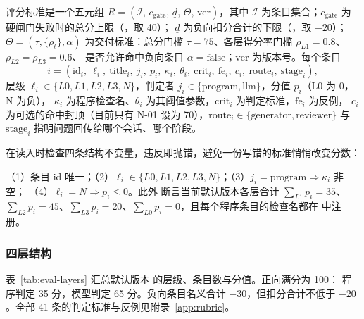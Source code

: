 \begin{definition}[评分标准]
\label{def:eval-rubric}
评分标准是一个五元组 $R=(\mathcal{I},\,c_{\mathrm{gate}},\,\underline{d},\,\Theta,\,\mathrm{ver})$，其中
$\mathcal{I}$ 为条目集合；$c_{\mathrm{gate}}$ 为硬闸门失败时的总分上限（，取 40）；
$\underline{d}$ 为负向扣分合计的下限（，取 $-20$）；
$\Theta=(\tau,\{\rho_\ell\},\alpha)$ 为交付标准：总分门槛 $\tau=75$、各层得分率门槛 $\rho_{L1}=0.8$、$\rho_{L2}=\rho_{L3}=0.6$、
是否允许命中负向条目 $\alpha=\text{false}$；$\mathrm{ver}$ 为版本号。每个条目
\[
i=(\mathrm{id}_i,\ \ell_i,\ \mathrm{title}_i,\ j_i,\ p_i,\ \kappa_i,\ \theta_i,\ \mathrm{crit}_i,\ \mathrm{fe}_i,\ c_i,\ \mathrm{route}_i,\ \mathrm{stage}_i),
\]
层级 $\ell_i\in\{L0,L1,L2,L3,N\}$，判定者 $j_i\in\{\text{program},\text{llm}\}$，分值 $p_i$（L0 为 0，N 为负），
$\kappa_i$ 为程序检查名、$\theta_i$ 为其阈值参数，$\mathrm{crit}_i$ 为判定标准，$\mathrm{fe}_i$ 为反例，
$c_i$ 为可选的命中封顶（目前只有 N-01 设为 70），$\mathrm{route}_i\in\{\text{generator},\text{reviewer}\}$ 与 $\mathrm{stage}_i$
指明问题回传给哪个会话、哪个阶段。
\end{definition}

 在读入时检查四条结构不变量，违反即抛错，避免一份写错的标准悄悄改变分数：
\begin{invariant}[评分标准的结构约束]
\label{inv:eval-rubric}
（1）条目 id 唯一；（2）$\ell_i\in\{L0,L1,L2,L3,N\}$；（3）$j_i=\text{program}\Rightarrow\kappa_i$ 非空；
（4）$\ell_i=N\Rightarrow p_i\le 0$。此外  断言当前默认版本各层合计
$\sum_{L1}p_i=35$、$\sum_{L2}p_i=45$、$\sum_{L3}p_i=20$、$\sum_{L0}p_i=0$，且每个程序条目的检查名都在  中注册。
\end{invariant}

\subsubsection{四层结构}

表~\ref{tab:eval-layers} 汇总默认版本  的层级、条目数与分值。正向满分为 100：
程序判定 35 分，模型判定 65 分。负向条目名义合计 $-30$，但扣分合计不低于 $-20$。全部 41 条的判定标准与反例见附录~\ref{app:rubric}。

